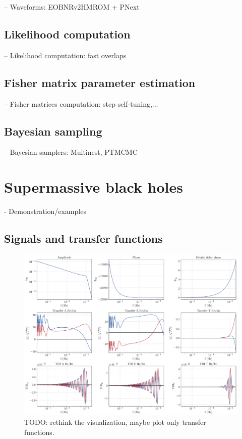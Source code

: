 \documentclass[aps,showpacs,twocolumn,prd,superscriptaddress,nofootinbib]{revtex4-1}
\newcommand{\SM}[1]{{\color{Blue} #1}}
\begin{document}
-- Waveforms: EOBNRv2HMROM + PNext


\subsection{Likelihood computation}
\label{sec:likelihood}

-- Likelihood computation: fast overlaps


\subsection{Fisher matrix parameter estimation}
\label{sec:Fisher}

-- Fisher matrices computation: step self-tuning,...


\subsection{Bayesian sampling}
\label{sec:samplers}

-- Bayesian samplers: Multinest, PTMCMC


\section{Supermassive black holes}
\label{sec:SMBH}

- Demonstration/examples


\subsection{Signals and transfer functions}
\label{sec:signaltransfer}

\begin{figure}
  \centering
  \includegraphics[width=.98\linewidth]{../plots/plot_smbh9_alltdi.pdf}
  \caption{\SM{TODO: rethink the visualization, maybe plot only transfer functions}.}
  \label{fig:tranferSMBHCase9}
\end{figure}
\end{document}
